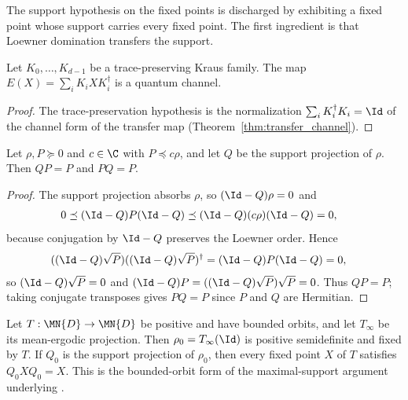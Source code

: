 The support hypothesis on the fixed points is discharged by exhibiting a
fixed point whose support carries every fixed point. The first ingredient is
that Loewner domination transfers the support.

\begin{lemma}%
    \label{lem:isChannel_transferMap}
    \leanok
    Let $K_0,\ldots,K_{d-1}$ be a trace-preserving Kraus family. The map
    $E(X)=\sum_iK_iXK_i^\dagger$ is a quantum channel.
\end{lemma}

\begin{proof}\leanok
    The trace-preservation hypothesis is the normalization
    $\sum_iK_i^\dagger K_i=\Id$ of the channel form of the transfer map
    (Theorem~\ref{thm:transfer_channel}).
\end{proof}

\begin{lemma}%
    \label{lem:stationaryProj_absorb_of_le}
    \leanok
    Let $\rho,P\succeq0$ and $c\in\C$ with $P\preceq c\rho$, and let $Q$
    be the support projection of $\rho$. Then $QP=P$ and $PQ=P$.
\end{lemma}

\begin{proof}
    \leanok
    The support projection absorbs $\rho$, so $(\Id-Q)\rho=0$ and
    \begin{align}
        0
         & \preceq(\Id-Q)P(\Id-Q)
        \preceq(\Id-Q)(c\rho)(\Id-Q)
        =0,
        \notag
    \end{align}
    because conjugation by $\Id-Q$ preserves the Loewner order. Hence
    \begin{align}
        ((\Id-Q)\sqrt{P})
        ((\Id-Q)\sqrt{P})^\dagger
         & =(\Id-Q)P(\Id-Q)=0,
        \notag
    \end{align}
    so $(\Id-Q)\sqrt{P}=0$ and
    $(\Id-Q)P=((\Id-Q)\sqrt{P})\sqrt{P}=0$. Thus $QP=P$; taking conjugate
    transposes gives $PQ=P$ since $P$ and $Q$ are Hermitian.
\end{proof}

\begin{theorem}%
    \label{thm:maximalSupport_fixedPoint_of_bounded_orbits}
    \leanok
    Let $T:\MN{D}\to\MN{D}$ be positive and have bounded orbits, and let
    $T_\infty$ be its mean-ergodic projection. Then
    $\rho_0=T_\infty(\Id)$ is positive semidefinite and fixed by $T$. If
    $Q_0$ is the support projection of $\rho_0$, then every fixed point $X$
    of $T$ satisfies $Q_0XQ_0=X$. This is the bounded-orbit form of the
    maximal-support argument underlying
    \cite[Proposition~6.9]{Wolf2012Quantum}.
\end{theorem}

